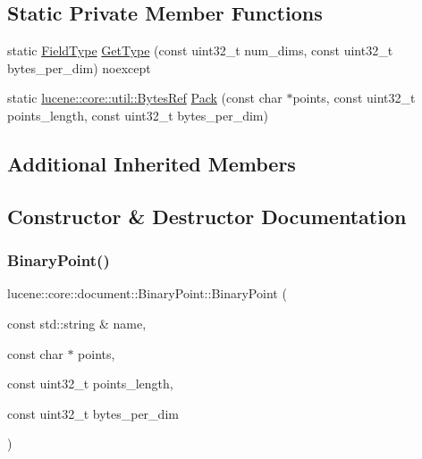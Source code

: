 \subsection*{Static Private Member Functions}
\begin{DoxyCompactItemize}
\item 
static \mbox{\hyperlink{classlucene_1_1core_1_1document_1_1FieldType}{Field\+Type}} \mbox{\hyperlink{classlucene_1_1core_1_1document_1_1BinaryPoint_a257a399b76249bf887b61a524765fa72}{Get\+Type}} (const uint32\+\_\+t num\+\_\+dims, const uint32\+\_\+t bytes\+\_\+per\+\_\+dim) noexcept
\item 
static \mbox{\hyperlink{classlucene_1_1core_1_1util_1_1BytesRef}{lucene\+::core\+::util\+::\+Bytes\+Ref}} \mbox{\hyperlink{classlucene_1_1core_1_1document_1_1BinaryPoint_a3dd125364391f40b4cc114c3a099542e}{Pack}} (const char $\ast$points, const uint32\+\_\+t points\+\_\+length, const uint32\+\_\+t bytes\+\_\+per\+\_\+dim)
\end{DoxyCompactItemize}
\subsection*{Additional Inherited Members}


\subsection{Constructor \& Destructor Documentation}
\mbox{\label{classlucene_1_1core_1_1document_1_1BinaryPoint_acd524392b16aaeaa05120e87a79e487f}} 
\subsubsection{\texorpdfstring{Binary\+Point()}{BinaryPoint()}\hspace{0.1cm}{\footnotesize\ttfamily [1/2]}}
{\footnotesize\ttfamily lucene\+::core\+::document\+::\+Binary\+Point\+::\+Binary\+Point (\begin{DoxyParamCaption}\item[{const std\+::string \&}]{name,  }\item[{const char $\ast$}]{points,  }\item[{const uint32\+\_\+t}]{points\+\_\+length,  }\item[{const uint32\+\_\+t}]{bytes\+\_\+per\+\_\+dim }\end{DoxyParamCaption})\hspace{0.3cm}{\ttfamily [inline]}}

